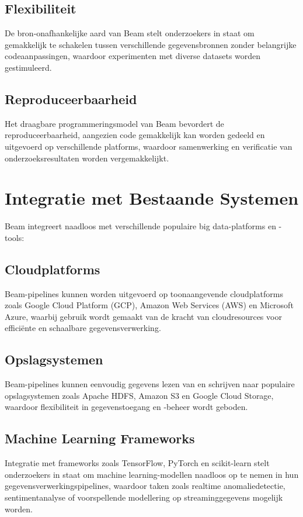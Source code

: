 \subsection{Flexibiliteit}
De bron-onafhankelijke aard van Beam stelt onderzoekers in staat om gemakkelijk te schakelen tussen verschillende gegevensbronnen zonder belangrijke codeaanpassingen, waardoor experimenten met diverse datasets worden gestimuleerd.

\subsection{Reproduceerbaarheid}
Het draagbare programmeringsmodel van Beam bevordert de reproduceerbaarheid, aangezien code gemakkelijk kan worden gedeeld en uitgevoerd op verschillende platforms, waardoor samenwerking en verificatie van onderzoeksresultaten worden vergemakkelijkt.

\section{Integratie met Bestaande Systemen}

Beam integreert naadloos met verschillende populaire big data-platforms en -tools:

\subsection{Cloudplatforms}
Beam-pipelines kunnen worden uitgevoerd op toonaangevende cloudplatforms zoals Google Cloud Platform (GCP), Amazon Web Services (AWS) en Microsoft Azure, waarbij gebruik wordt gemaakt van de kracht van cloudresources voor efficiënte en schaalbare gegevensverwerking.

\subsection{Opslagsystemen}
Beam-pipelines kunnen eenvoudig gegevens lezen van en schrijven naar populaire opslagsystemen zoals Apache HDFS, Amazon S3 en Google Cloud Storage, waardoor flexibiliteit in gegevenstoegang en -beheer wordt geboden.

\subsection{Machine Learning Frameworks}
Integratie met frameworks zoals TensorFlow, PyTorch en scikit-learn stelt onderzoekers in staat om machine learning-modellen naadloos op te nemen in hun gegevensverwerkingspipelines, waardoor taken zoals realtime anomaliedetectie, sentimentanalyse of voorspellende modellering op streaminggegevens mogelijk worden.

